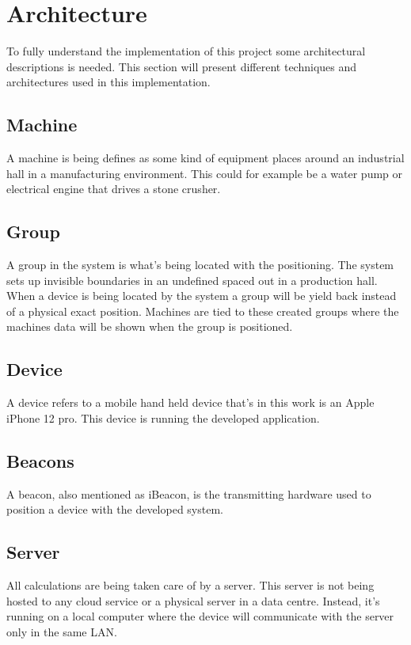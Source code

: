 \section{Architecture}\label{sec:implArchitecture}
To fully understand the implementation of this project some architectural descriptions is needed.
This section will present different techniques and architectures used in this implementation.


\subsection{Machine}\label{sec:implArchitectureMachine}
A machine is being defines as some kind of equipment places around an industrial hall in a manufacturing environment.
This could for example be a water pump or electrical engine that drives a stone crusher.


\subsection{Group}\label{sec:implArchitectureGroup}
A group in the system is what's being located with the positioning.
The system sets up invisible boundaries in an undefined spaced out in a production hall.
When a device is being located by the system a group will be yield back instead of a physical exact position.
Machines are tied to these created groups where the machines data will be shown when the group is positioned.


\subsection{Device}\label{sec:implArchitectureDevice}
A device refers to a mobile hand held device that's in this work is an Apple iPhone 12 pro.
This device is running the developed application.


\subsection{Beacons}\label{sec:implArchitectureBeacons}
A beacon, also mentioned as iBeacon, is the transmitting hardware used to position a device with the developed system.


\subsection{Server}\label{sec:implArchitectureServer}
All calculations are being taken care of by a server.
This server is not being hosted to any cloud service or a physical server in a data centre.
Instead, it's running on a local computer where the device will communicate with the server only in the same LAN.


